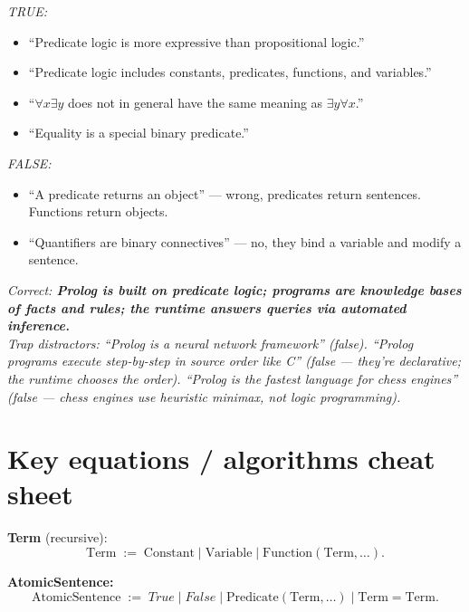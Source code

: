 \documentclass[11pt, a4paper]{article}
\begin{document}
\begin{exambox}
\textit{TRUE:}
\begin{itemize}[leftmargin=*, itemsep=0pt, topsep=0pt]
  \item ``Predicate logic is more expressive than propositional logic.''
  \item ``Predicate logic includes constants, predicates, functions, and variables.''
  \item ``$\forall x \exists y$ does not in general have the same meaning as $\exists y \forall x$.''
  \item ``Equality is a special binary predicate.''
\end{itemize}
\textit{FALSE:}
\begin{itemize}[leftmargin=*, itemsep=0pt, topsep=0pt]
  \item ``A predicate returns an object'' — wrong, predicates return sentences. Functions return objects.
  \item ``Quantifiers are binary connectives'' — no, they bind a variable and modify a sentence.
\end{itemize}
\end{exambox}

\begin{exambox}
\textit{Correct: \textbf{Prolog is built on predicate logic; programs are knowledge bases of facts and rules; the runtime answers queries via automated inference.}}\\[0.3em]
\textit{Trap distractors: ``Prolog is a neural network framework'' (false). ``Prolog programs execute step-by-step in source order like C'' (false — they're declarative; the runtime chooses the order). ``Prolog is the fastest language for chess engines'' (false — chess engines use heuristic minimax, not logic programming).}
\end{exambox}

\section*{Key equations / algorithms cheat sheet}

\textbf{Term} (recursive):
\[
\text{Term} \;:=\; \text{Constant} \;|\; \text{Variable} \;|\; \text{Function}(\text{Term}, \dots).
\]

\textbf{AtomicSentence:}
\[
\text{AtomicSentence} \;:=\; True \;|\; False \;|\; \text{Predicate}(\text{Term}, \dots) \;|\; \text{Term} = \text{Term}.
\]
\end{document}
